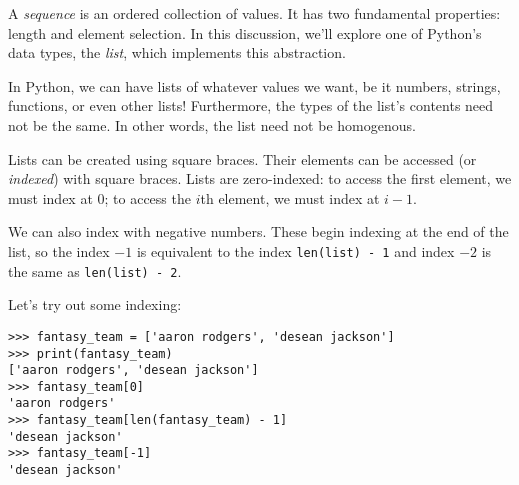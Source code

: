 A \textit{sequence} is an ordered collection of values. It has two
fundamental properties: length and element selection. In this
discussion, we'll explore one of Python's data types,
the \textit{list}, which implements this abstraction.

In Python, we can have lists of whatever values we want, be it
numbers, strings, functions, or even other lists!  Furthermore, the
types of the list's contents need not be the same. In other words, the
list need not be homogenous.

Lists can be created using square braces. Their elements can be
accessed (or \textit{indexed}) with square braces. Lists are
zero-indexed: to access the first element, we must index at 0; to access
the $i$th element, we must index at $i - 1$.

We can also index with negative numbers. These begin indexing at the
end of the list, so the index $-1$ is equivalent to the index
\texttt{len(list) - 1} and index $-2$ is the same as
\texttt{len(list) - 2}.

Let's try out some indexing:
\begin{lstlisting}
>>> fantasy_team = ['aaron rodgers', 'desean jackson']
>>> print(fantasy_team)
['aaron rodgers', 'desean jackson']
>>> fantasy_team[0]
'aaron rodgers'
>>> fantasy_team[len(fantasy_team) - 1]
'desean jackson'
>>> fantasy_team[-1]
'desean jackson'
\end{lstlisting}
